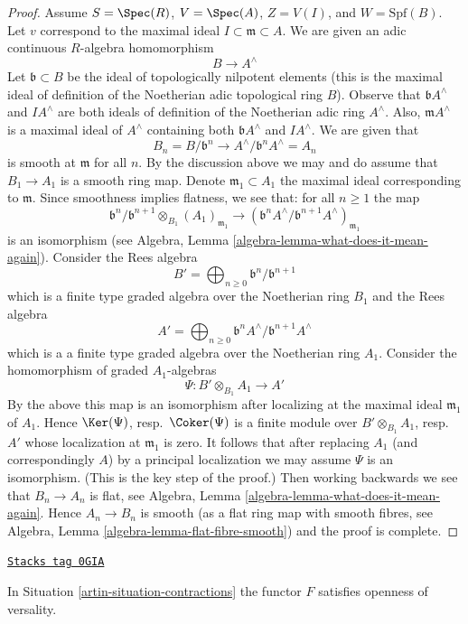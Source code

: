 \begin{proof}
\medskip\noindent
Assume $S = \Spec(R)$, $V = \Spec(A)$, $Z = V(I)$, and $W = \text{Spf}(B)$.
Let $v$ correspond to the maximal ideal $I \subset \mathfrak m \subset A$.
We are given an adic continuous $R$-algebra homomorphism
$$
B \longrightarrow A^\wedge
$$
Let $\mathfrak b \subset B$ be the ideal of topologically nilpotent
elements (this is the maximal ideal of definition of the Noetherian adic
topological ring $B$). Observe that $\mathfrak b A^\wedge$ and
$IA^\wedge$ are both ideals of definition of the Noetherian adic
ring $A^\wedge$. Also, $\mathfrak m A^\wedge$ is a maximal ideal
of $A^\wedge$ containing both $\mathfrak b A^\wedge$ and $IA^\wedge$.
We are given that
$$
B_n = B/\mathfrak b^n \to A^\wedge/\mathfrak b^n A^\wedge = A_n
$$
is smooth at $\mathfrak m$ for all $n$. By the discussion above
we may and do assume that $B_1 \to A_1$ is a smooth ring map.
Denote $\mathfrak m_1 \subset A_1$ the maximal ideal corresponding
to $\mathfrak m$. Since smoothness implies flatness, we see that:
for all $n \geq 1$ the map
$$
\mathfrak b^n/\mathfrak b^{n + 1} \otimes_{B_1} (A_1)_{\mathfrak m_1}
\longrightarrow
\left(\mathfrak b^nA^\wedge/\mathfrak b^{n + 1}A^\wedge\right)_{\mathfrak m_1}
$$
is an isomorphism (see
Algebra, Lemma \ref{algebra-lemma-what-does-it-mean-again}).
Consider the Rees algebra
$$
B' = \bigoplus\nolimits_{n \geq 0} \mathfrak b^n/\mathfrak b^{n + 1}
$$
which is a finite type graded algebra over the Noetherian ring $B_1$ and
the Rees algebra
$$
A' = \bigoplus\nolimits_{n \geq 0}
\mathfrak b^nA^\wedge/\mathfrak b^{n + 1}A^\wedge
$$
which is a a finite type graded algebra over the Noetherian ring $A_1$.
Consider the homomorphism of graded $A_1$-algebras
$$
\Psi : B' \otimes_{B_1} A_1 \longrightarrow A'
$$
By the above this map is an isomorphism after localizing at
the maximal ideal $\mathfrak m_1$ of $A_1$.
Hence $\Ker(\Psi)$, resp.\ $\Coker(\Psi)$ is a finite module
over $B' \otimes_{B_1} A_1$, resp.\ $A'$ whose localization
at $\mathfrak m_1$ is zero. It follows that after replacing
$A_1$ (and correspondingly $A$) by a principal localization
we may assume $\Psi$ is an isomorphism. (This is the key step of the proof.)
Then working backwards we see that $B_n \to A_n$ is flat, see
Algebra, Lemma \ref{algebra-lemma-what-does-it-mean-again}.
Hence $A_n \to B_n$ is smooth (as a flat ring map with smooth
fibres, see Algebra, Lemma \ref{algebra-lemma-flat-fibre-smooth})
and the proof is complete.
\end{proof}

\begin{lemma}
\label{artin-lemma-openness-versality}
\href{https://stacks.math.columbia.edu/tag/0GIA}{\texttt{Stacks tag 0GIA}}

In Situation \ref{artin-situation-contractions} the functor
$F$ satisfies openness of versality.
\end{lemma}

